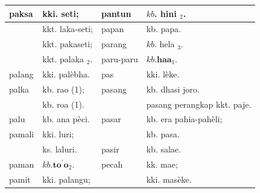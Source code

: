 \documentclass[10pt]{article}
\begin{document}
\begin{center}
\begin{tabular}{|l|l|l|l|}
\hline
paksa & kki. seti; & pantun & \(k b\). hini \(_{2}\). \\
\hline
 & kkt. laka-seti; & papan & kb. papa. \\
\hline
 & kkt. pakaseti; & parang & \(k b\). hela \(_{3}\). \\
\hline
 & kkt. palaka \({ }_{2}\). & paru-paru & \(k b . \mathbf{h a a}_{1}\). \\
\hline
palang & kki. palèbha. & pas & kki. lèke. \\
\hline
palka & kb. rao (1); & pasang & kb. dhasi joro. \\
\hline
 & kb. roa (1). &  & pasang perangkap kkt. paje. \\
\hline
palu & kb. ana pèci. & pasar & kb. era pahia-pahèli; \\
\hline
pamali & kki. luri; &  & kb. pasa. \\
\hline
 & ks. laluri. & pasir & kb. salae. \\
\hline
paman & \(k b . \mathbf{t o}^{\prime} \mathbf{o}_{2}\). & pecah & kk. mae; \\
\hline
pamit & kki. palangu; &  & kki. masèke. \\
\hline
\end{tabular}
\end{center}
\end{document}
